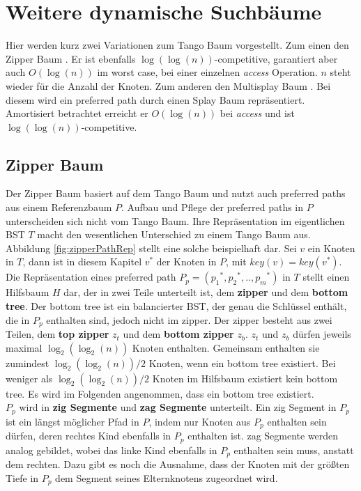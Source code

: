 \documentclass[a4paper,12pt]{article}
\begin{document}
\section {Weitere dynamische Suchbäume}
Hier werden kurz zwei Variationen zum Tango Baum vorgestellt. Zum einen den Zipper Baum \cite{zipper}. Er ist ebenfalls $\log\left(\log\left(n\right)\right)$-competitive,  garantiert aber auch  $O\left(\log \left(n\right)\right)$ im worst case, bei einer einzelnen \textit{access} Operation. $n$ steht wieder für die Anzahl der Knoten. Zum anderen den Multisplay Baum \cite{multisplay}. Bei diesem wird ein preferred path durch einen Splay Baum repräsentiert. Amortisiert betrachtet erreicht er $O\left(\log \left(n\right)\right)$ bei \textit{access} und ist  $\log\left(\log\left(n\right)\right)$-competitive. 

\subsection{Zipper Baum}
Der Zipper Baum basiert auf dem Tango Baum und nutzt auch preferred paths aus einem Referenzbaum $P$. Aufbau und Pflege der preferred paths in $P$ unterscheiden sich nicht vom Tango Baum.  Ihre Repräsentation im eigentlichen BST $T$ macht den wesentlichen Unterschied zu einem Tango Baum aus. Abbildung \ref{fig:zipperPathRep} stellt eine solche beispielhaft dar.  Sei $v$ ein Knoten in $T$, dann ist in diesem Kapitel $v^*$ der Knoten in $P$, mit $\mathit{key}\left(v\right) =\mathit{key}\left(v^*\right)$. Die Repräsentation eines preferred path  $P_p = \left({p_1}^*,{p_2}^*,..,{p_m}^*\right)$ in $T$ stellt einen Hilfsbaum $H$ dar, der in zwei Teile unterteilt ist, dem \textbf{zipper} und dem \textbf{bottom tree}.  Der bottom tree ist ein balancierter BST, der genau die Schlüssel enthält, die in $P_p$ enthalten sind, jedoch nicht im zipper. Der zipper besteht aus zwei Teilen, dem \textbf{top zipper} $z_t$ und dem \textbf{bottom zipper} $z_b$. $z_t$ und $z_b$ dürfen jeweils maximal $\log_2\left(\log_2\left(n\right)\right)$ Knoten enthalten. Gemeinsam  enthalten sie zumindest $\log_2\left(\log_2\left(n\right)\right) / 2$ Knoten, wenn ein bottom tree existiert. Bei weniger als $\log_2\left(\log_2\left(n\right)\right) / 2$ Knoten im Hilfsbaum existiert kein bottom tree. Es wird im Folgenden angenommen, dass ein bottom tree existiert. \\
$P_p$ wird in \textbf{zig Segmente} und \textbf{zag Segmente} unterteilt. Ein zig Segment in $P_p$ ist ein längst möglicher Pfad in $P$, indem nur Knoten aus $P_p$ enthalten sein dürfen, deren rechtes Kind ebenfalls in $P_p$ enthalten ist. zag Segmente werden analog gebildet, wobei das linke Kind ebenfalls in $P_p$ enthalten sein muss, anstatt dem rechten. Dazu gibt es noch die Ausnahme, dass der Knoten mit der größten Tiefe in $P_p$ dem Segment seines Elternknotens zugeordnet wird.\\
\end{document}
